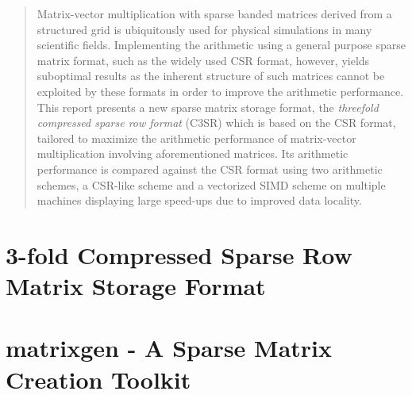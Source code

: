 \documentclass{report}
\begin{document}
\begin{minipage}[h]{\textwidth}
\begin{minipage}[h]{\textwidth}
\end{minipage} \vspace{0.5cm} \begin{abstract} Matrix-vector multiplication with sparse banded matrices derived from a
  structured grid is ubiquitously used for physical simulations in many scientific fields. Implementing the arithmetic
  using a general purpose sparse matrix format, such as the widely used CSR format, however, yields suboptimal results
  as the inherent structure of such matrices cannot be exploited by these formats in order to improve the arithmetic
  performance. This report presents a new sparse matrix storage format, the \emph{threefold compressed sparse row
  format} (C3SR) which is based on the CSR format, tailored to maximize the arithmetic performance of matrix-vector
  multiplication involving aforementioned matrices. Its arithmetic performance is compared against the CSR format using
  two arithmetic schemes, a CSR-like scheme and a vectorized SIMD scheme on multiple machines displaying large speed-ups
  due to improved data locality. \end{abstract}

\end{minipage}

\newpage
\tableofcontents
\newpage
\listoffigures

\part{3-fold Compressed Sparse Row Matrix Storage Format}

  
  
  
  

\part{matrixgen - A Sparse Matrix Creation Toolkit}

  
  



\printbibliography
{}
\end{document}
